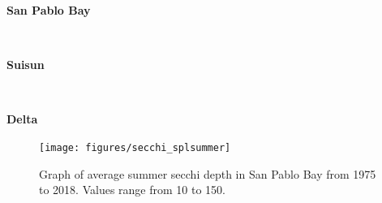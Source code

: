 \documentclass[
]{book}
\begin{document}
\begin{panel-grid}

\begin{columns-nocenter}

\begin{column800}

\textbf{San Pablo Bay}

\end{column800}

\begin{column40}

~

\end{column40}

\begin{column800}

\textbf{Suisun}

\end{column800}

\begin{column40}

~

\end{column40}

\begin{column800}

\textbf{Delta}

\end{column800}

\end{columns-nocenter}

\begin{columns-nocenter}

\begin{column800}

\begin{expand}

\begin{figure}
\texttt{[image: figures/secchi\_splsummer]} \caption{Graph of average summer secchi depth in San Pablo Bay from 1975 to 2018. Values range from 10 to 150.}\label{fig:unnamed-chunk-51}
\end{figure}

\end{expand}

\end{column800}

\begin{column40}

~

\end{column40}


\end{columns-nocenter}
\end{panel-grid}
\end{document}
